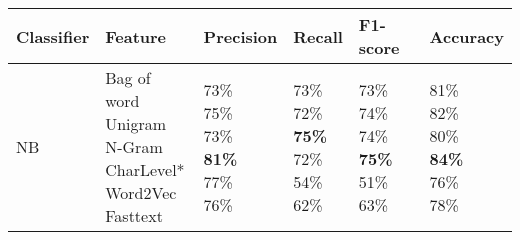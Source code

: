 \documentclass[sn-mathphys,Numbered]{sn-jnl}%
\begin{document}
\begin{table}[ht]
\centering
\begin{tabular}{llllll}
\hline
\textbf{Classifier} & \textbf{Feature} & \textbf{Precision} & \textbf{Recall}& \textbf{F1-score} & \textbf{Accuracy} \\
\hline
NB & \makecell{Bag of word\\ Unigram\\ N-Gram\\CharLevel* \\ Word2Vec \\ Fasttext} & 
\makecell{73\% \\75\%\\ 73\%\\ \textbf{81\%} \\ 77\% \\76\%}& 
\makecell{73\% \\ 72\%\\ \textbf{75\%}\\ 72\%\\ 54\% \\ 62\%}&
\makecell{73\% \\ 74\%\\  74\%\\\textbf{75\%}\\ 51\% \\ 63\%}&
\makecell{81\% \\ 82\%\\   80\%\\\textbf{84\%}\\ 76\% \\ 78\%} \\

\hline


\end{tabular}
\end{table}
\end{document}
